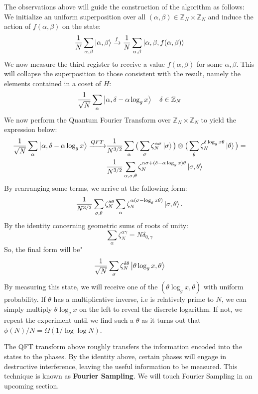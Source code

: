 \documentclass{../quantum.tex}
\begin{document}
The observations above will guide the construction of the algorithm as follows: We initialize an uniform superposition over all $(\alpha,\beta) \in \mathbb{Z}_N \times \mathbb{Z}_N $ and induce the action of $f(\alpha, \beta)$ on the state:
%
\begin{gather}
  \frac{1}{N} \sum_{\alpha,\beta} \ket{\alpha, \beta} \xrightarrow{f} \frac{1}{N} \sum_{\alpha,\beta} \ket{\alpha, \beta, f(\alpha, \beta)}
\end{gather}
%
We now measure the third register to receive a value $f(\alpha,\beta)$ for some $\alpha,\beta$. This will collapse the superposition to those consistent with the result, namely the elements contained in a coset of $H$:
%
\begin{equation}
  \frac{1}{\sqrt{N}} \sum_{\alpha} \ket{\alpha,\delta - \alpha\log_g{x}} \quad \delta \in \mathbb{Z}_N
\end{equation}
%
We now perform the Quantum Fourier Transform over $\mathbb{Z}_N \times \mathbb{Z}_N$ to yield the expression below:
%
\begin{gather}
  \begin{split}
    \frac{1}{\sqrt{N}} \sum_{\alpha} \ket{\alpha,\delta - \alpha\log_g{x}} \xrightarrow{QFT}
    & \frac{1}{N^{3/2}} \sum_{\alpha} \big(\sum_{\sigma} \zeta_N^{\alpha\sigma} \ket{\sigma}\big) \otimes \big(\sum_{\theta} \zeta_N^{\delta\log_g{x}\theta} \ket{\theta} \big) = \\
    & \frac{1}{N^{3/2}}\sum_{\alpha,\sigma,\theta} \zeta_N^{\alpha\sigma + (\delta - \alpha\log_g{x})\theta} \ket{\sigma,\theta}
  \end{split}
\end{gather}
By rearranging some terms, we arrive at the following form:
%
\begin{gather}
\frac{1}{N^{3/2}}\sum_{\sigma,\theta} \zeta_N^{\delta\theta} \sum_{\alpha} \zeta_N^{\alpha(\sigma - \log_g{x}\theta)}\ket{\sigma,\theta}.
\end{gather}
%
By the identity concerning geometric sums of roots of unity:
$$ \sum_{\alpha} \zeta_N^{\alpha\gamma} = N \delta_{0,\gamma} $$
So, the final form will be"
%
$$ \frac{1}{\sqrt{N}} \sum_{\sigma} \zeta_N^{\delta\theta} \ket{\theta\log_g{x},\theta} $$
By measuring this state, we will receive one of the $(\theta\log_g{x}, \theta)$ with uniform probability. If $\theta$ has a multiplicative inverse, i.e is relatively prime to $N$, we can simply multiply $\theta\log_g{x}$ on the left to reveal the discrete logarithm. If not, we repeat the experiment until we find such a $\theta$ as it turns out that $\phi(N) / N = \Omega(1/\log\log{N})$.
%
\begin{remark}
  The QFT transform above roughly transfers the information encoded into the states to the phases. By the identity above, certain phases will engage in destructive interference, leaving the useful information to be measured. This technique is known as {\bf Fourier Sampling}. We will touch Fourier Sampling in an upcoming section.
\end{remark}
\end{document}
